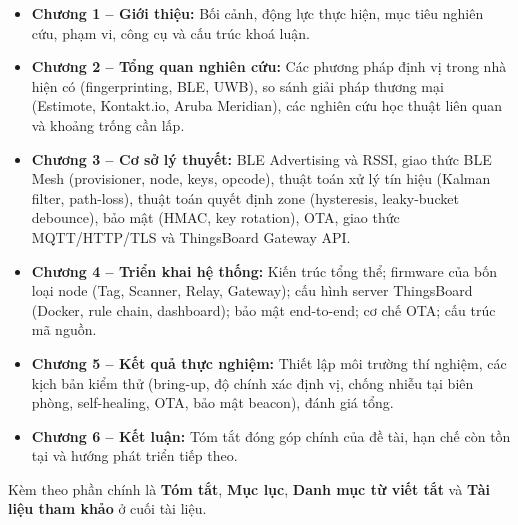 \begin{itemize}
    \item \textbf{Chương 1 -- Giới thiệu:} Bối cảnh, động lực thực hiện, mục tiêu nghiên cứu, phạm vi, công cụ và cấu trúc khoá luận.

    \item \textbf{Chương 2 -- Tổng quan nghiên cứu:} Các phương pháp định vị trong nhà hiện có (fingerprinting, BLE, UWB), so sánh giải pháp thương mại (Estimote, Kontakt.io, Aruba Meridian), các nghiên cứu học thuật liên quan và khoảng trống cần lấp.

    \item \textbf{Chương 3 -- Cơ sở lý thuyết:} BLE Advertising và RSSI, giao thức BLE Mesh (provisioner, node, keys, opcode), thuật toán xử lý tín hiệu (Kalman filter, path-loss), thuật toán quyết định zone (hysteresis, leaky-bucket debounce), bảo mật (HMAC, key rotation), OTA, giao thức MQTT/HTTP/TLS và ThingsBoard Gateway API.

    \item \textbf{Chương 4 -- Triển khai hệ thống:} Kiến trúc tổng thể; firmware của bốn loại node (Tag, Scanner, Relay, Gateway); cấu hình server ThingsBoard (Docker, rule chain, dashboard); bảo mật end-to-end; cơ chế OTA; cấu trúc mã nguồn.

    \item \textbf{Chương 5 -- Kết quả thực nghiệm:} Thiết lập môi trường thí nghiệm, các kịch bản kiểm thử (bring-up, độ chính xác định vị, chống nhiễu tại biên phòng, self-healing, OTA, bảo mật beacon), đánh giá tổng.

    \item \textbf{Chương 6 -- Kết luận:} Tóm tắt đóng góp chính của đề tài, hạn chế còn tồn tại và hướng phát triển tiếp theo.
\end{itemize}

Kèm theo phần chính là \textbf{Tóm tắt}, \textbf{Mục lục}, \textbf{Danh mục từ viết tắt} và \textbf{Tài liệu tham khảo} ở cuối tài liệu.
